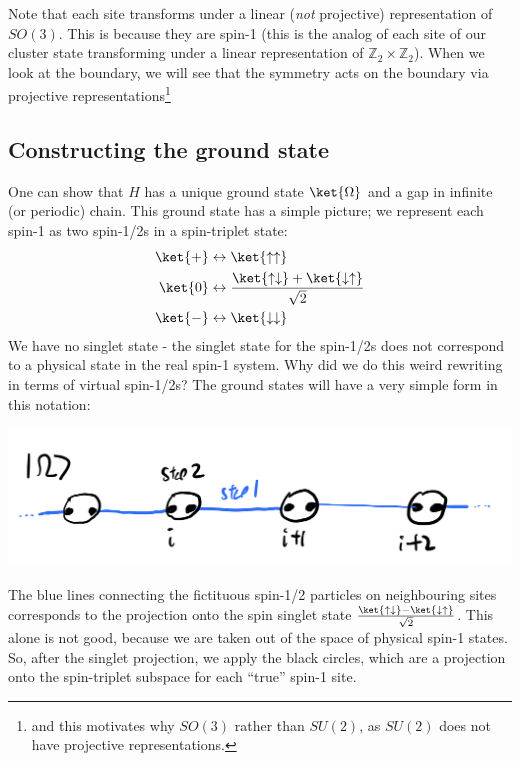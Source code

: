 Note that each site transforms under a linear (\emph{not} projective) representation of $SO(3)$. This is because they are spin-1 (this is the analog of each site of our cluster state transforming under a linear representation of $\mathbb{Z}_2 \times \mathbb{Z}_2$). When we look at the boundary, we will see that the symmetry acts on the boundary via projective representations\footnote{and this motivates why $SO(3)$ rather than $SU(2)$, as $SU(2)$ does not have projective representations.}

\subsection{Constructing the ground state}
One can show that $H$ has a unique ground state $\ket{\Omega}$ and a gap in infinite (or periodic) chain. This ground state has a simple picture; we represent each spin-1 as two spin-1/2s in a spin-triplet state:
\begin{equation}
    \begin{split}
        \ket{+} &\leftrightarrow \ket{\uparrow\uparrow}
        \\ \ket{0} &\leftrightarrow \frac{\ket{\uparrow\downarrow} + \ket{\downarrow\uparrow}}{\sqrt{2}}
        \\ \ket{-} &\leftrightarrow \ket{\downarrow\downarrow}
    \end{split}
\end{equation}
We have no singlet state - the singlet state for the spin-1/2s does not correspond to a physical state in the real spin-1 system. Why did we do this weird rewriting in terms of virtual spin-1/2s? The ground states will have a very simple form in this notation:

\begin{center}
    \includegraphics[scale=0.35]{Lectures/Images/lec15-AKLTGS.png}
\end{center}

The blue lines connecting the fictituous spin-1/2 particles on neighbouring sites corresponds to the projection onto the spin singlet state $\frac{\ket{\uparrow\downarrow} - \ket{\downarrow\uparrow}}{\sqrt{2}}$. This alone is not good, because we are taken out of the space of physical spin-1 states. So, after the singlet projection, we apply the black circles, which are a projection onto the spin-triplet subspace for each ``true'' spin-1 site.


